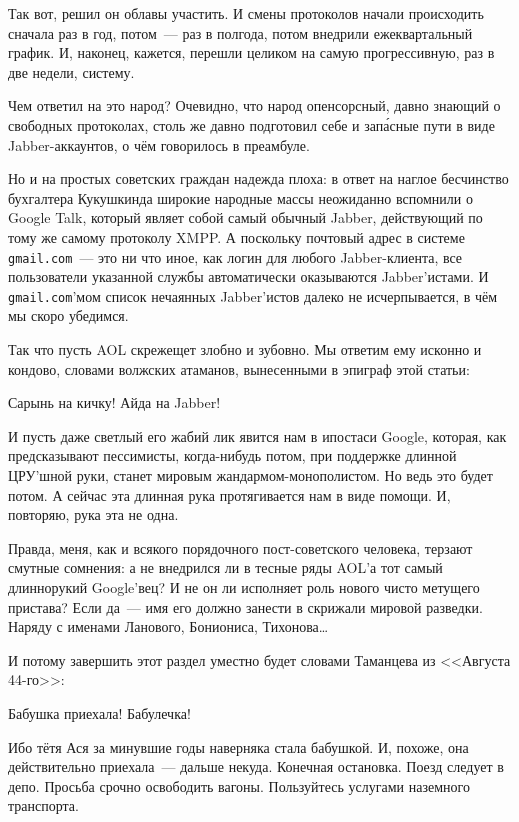 Так вот, решил он облавы участить. И смены протоколов начали происходить сначала раз в год, потом~--- раз в полгода, потом внедрили ежеквартальный график. И, наконец, кажется, перешли целиком на самую прогрессивную, раз в две недели, систему. 

Чем ответил на это народ? Очевидно, что народ опенсорсный, давно знающий о свободных протоколах, столь же давно подготовил себе и зап\'{а}сные пути в виде Jabber-аккаунтов, о чём говорилось в преамбуле. 

Но и на простых советских граждан надежда плоха: в ответ на наглое бесчинство бухгалтера Кукушкинда широкие народные массы неожиданно вспомнили о Google Talk, который являет собой самый обычный Jabber, действующий по тому же самому протоколу XMPP. А поскольку почтовый адрес в системе \texttt{gmail.com}~--- это ни что иное, как логин для любого Jabber-клиента, все пользователи указанной службы автоматически оказываются Jabber'истами. И \texttt{gmail.com}'мом список нечаянных Jabber'истов далеко не исчерпывается, в чём мы скоро убедимся. 

Так что пусть AOL скрежещет злобно и зубовно. Мы ответим ему исконно и кондово, словами волжских атаманов, вынесенными в эпиграф этой статьи: 


\begin{shadequote}{}
Сарынь на кичку! Айда на Jabber!
\end{shadequote}

И пусть даже светлый его жабий лик явится нам в ипостаси Google, которая, как предсказывают пессимисты, когда-нибудь потом, при поддержке длинной ЦРУ'шной руки, станет мировым жандармом-монополистом. Но ведь это будет потом. А сейчас эта длинная рука протягивается нам в виде помощи. И, повторяю, рука эта не одна. 

Правда, меня, как и всякого порядочного пост-советского человека, терзают смутные сомнения: а не внедрился ли в тесные ряды AOL'а тот самый длиннорукий Google'вец? И не он ли исполняет роль нового чисто метущего пристава? Если да~--- имя его должно занести в скрижали мировой разведки. Наряду с именами Ланового, Бониониса, Тихонова\dots 

И потому завершить этот раздел уместно будет словами Таманцева из <<Августа 44-го>>: 


\begin{shadequote}{}
Бабушка приехала! Бабулечка!
\end{shadequote}

Ибо тётя Ася за минувшие годы наверняка стала бабушкой. И, похоже, она действительно приехала~--- дальше некуда. Конечная остановка. Поезд следует в депо. Просьба срочно освободить вагоны. Пользуйтесь услугами наземного транспорта. 

